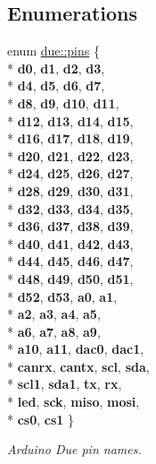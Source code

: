 \subsection*{Enumerations}
\begin{DoxyCompactItemize}
\item 
enum \hyperlink{namespacedue_a8ffa3ec309934ff9db34317e504bcc92}{due\+::pins} \{ \\*
{\bfseries d0}, 
{\bfseries d1}, 
{\bfseries d2}, 
{\bfseries d3}, 
\\*
{\bfseries d4}, 
{\bfseries d5}, 
{\bfseries d6}, 
{\bfseries d7}, 
\\*
{\bfseries d8}, 
{\bfseries d9}, 
{\bfseries d10}, 
{\bfseries d11}, 
\\*
{\bfseries d12}, 
{\bfseries d13}, 
{\bfseries d14}, 
{\bfseries d15}, 
\\*
{\bfseries d16}, 
{\bfseries d17}, 
{\bfseries d18}, 
{\bfseries d19}, 
\\*
{\bfseries d20}, 
{\bfseries d21}, 
{\bfseries d22}, 
{\bfseries d23}, 
\\*
{\bfseries d24}, 
{\bfseries d25}, 
{\bfseries d26}, 
{\bfseries d27}, 
\\*
{\bfseries d28}, 
{\bfseries d29}, 
{\bfseries d30}, 
{\bfseries d31}, 
\\*
{\bfseries d32}, 
{\bfseries d33}, 
{\bfseries d34}, 
{\bfseries d35}, 
\\*
{\bfseries d36}, 
{\bfseries d37}, 
{\bfseries d38}, 
{\bfseries d39}, 
\\*
{\bfseries d40}, 
{\bfseries d41}, 
{\bfseries d42}, 
{\bfseries d43}, 
\\*
{\bfseries d44}, 
{\bfseries d45}, 
{\bfseries d46}, 
{\bfseries d47}, 
\\*
{\bfseries d48}, 
{\bfseries d49}, 
{\bfseries d50}, 
{\bfseries d51}, 
\\*
{\bfseries d52}, 
{\bfseries d53}, 
{\bfseries a0}, 
{\bfseries a1}, 
\\*
{\bfseries a2}, 
{\bfseries a3}, 
{\bfseries a4}, 
{\bfseries a5}, 
\\*
{\bfseries a6}, 
{\bfseries a7}, 
{\bfseries a8}, 
{\bfseries a9}, 
\\*
{\bfseries a10}, 
{\bfseries a11}, 
{\bfseries dac0}, 
{\bfseries dac1}, 
\\*
{\bfseries canrx}, 
{\bfseries cantx}, 
{\bfseries scl}, 
{\bfseries sda}, 
\\*
{\bfseries scl1}, 
{\bfseries sda1}, 
{\bfseries tx}, 
{\bfseries rx}, 
\\*
{\bfseries led}, 
{\bfseries sck}, 
{\bfseries miso}, 
{\bfseries mosi}, 
\\*
{\bfseries cs0}, 
{\bfseries cs1}
 \}\begin{DoxyCompactList}\small\item\em Arduino Due pin names. \end{DoxyCompactList}
\end{DoxyCompactItemize}
